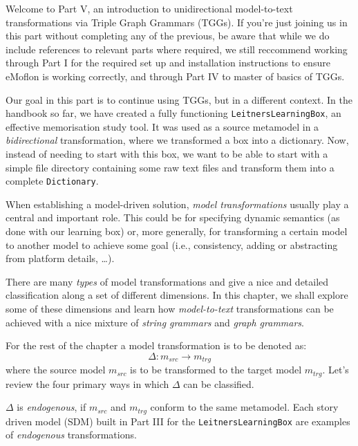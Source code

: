 \genHeader

Welcome to Part V, an introduction to unidirectional model-to-text transformations via Triple Graph Grammars (TGGs). If you're just joining us in this part
without completing any of the previous, be aware that while we do include references to relevant parts where required, we still reccommend working through Part
I for the required set up and installation instructions to ensure eMoflon is working correctly, and through Part IV to master of basics of TGGs. 

Our goal in this part is to continue using TGGs, but in a different context. In the handbook so far, we have created a fully functioning
\texttt{Leit\-ners\-Learn\-ing\-Box}, an effective memorisation study tool. It was used as a source metamodel in a \emph{bidirectional} transformation, where we
transformed a box into a dictionary. Now, instead of needing to start with this box, we want to be able to start with a simple file directory
containing some raw text files and transform them into a complete \texttt{Dictionary}.

When establishing a model-driven solution, \emph{model transformations} usually play a central and important role. This could be
for specifying dynamic semantics (as done with our learning box) or, more generally, for transforming a certain model to another model to achieve some goal
(i.e., consistency, adding or abstracting from platform details, \ldots).

There are many \emph{types} of model transformations and \cite{CH03,Mens_Gorp_2006} give a nice and detailed classification along a set of different
dimensions. In this chapter, we shall explore some of these dimensions and learn how \emph{model-to-text}
transformations can be achieved with a nice mixture of \emph{string grammars} and \emph{graph grammars}.

For the rest of the chapter a model transformation is to be denoted as:
\begin{displaymath}
 	\Delta: m_{src} \rightarrow m_{trg}
\end{displaymath}
where the source model $m_{src}$ is to be transformed to the target model $m_{trg}$. Let's review the four primary ways in which $\Delta$ can be classified.

$\Delta$ is \emph{endogenous}, if $m_{src}$ and $m_{trg}$ conform to the same metamodel. Each story driven model (SDM) built in Part III for
the \texttt{LeitnersLearningBox} are examples of \emph{endogenous} transformations.

